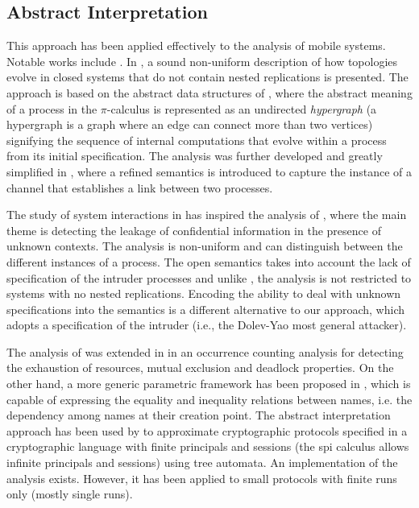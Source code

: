 \documentclass[10pt,a4paper,final,oneside,fleqn]{book}
\begin{document}
\subsection{Abstract Interpretation}
This approach has been applied effectively to the analysis of mobile systems.  Notable works include \cite{venet1,venet2,monn1,feret1,feret2,feret3}.  In \cite{venet1}, a sound non-uniform description of how topologies evolve in closed systems that do not contain nested replications is presented. The approach is based on the abstract data structures of \cite{jon1}, where the abstract meaning of a process in the $\pi$-calculus is represented as an undirected {\itshape hypergraph\/} (a hypergraph is a graph where an edge can connect more than two vertices) signifying the sequence of internal computations that evolve within a process from its initial specification. The analysis was further developed and greatly simplified in \cite{venet2}, where a refined semantics is introduced to capture the instance of a channel that establishes a link between two processes.

The study of system interactions in \cite{venet2} has inspired the analysis of \cite{feret1}, where the main theme is detecting the leakage of confidential information in the presence of unknown contexts.  The analysis is non-uniform and can distinguish between the different instances of a process.  The open semantics takes into account the lack of specification of the intruder processes and unlike \cite{venet1,venet2}, the analysis is not restricted to systems with no nested replications.  Encoding the ability to deal with unknown specifications into the semantics is a different alternative to our approach, which adopts a specification of the intruder (i.e., the Dolev-Yao most general attacker).

The analysis of \cite{feret1} was extended in \cite{feret2} in an occurrence counting analysis for detecting the exhaustion of resources, mutual exclusion and deadlock properties.  On the other hand, a more generic parametric framework has been proposed in \cite{feret3}, which is capable of expressing the equality and inequality relations between names, i.e. the dependency among names at their creation point.  The abstract interpretation approach has been used by \cite{monn1} to approximate cryptographic protocols specified in a cryptographic language with finite principals and sessions (the spi calculus allows infinite principals and sessions) using tree automata.  An implementation of the analysis exists. However, it has been applied to small protocols with finite runs only (mostly single runs).
\end{document}
